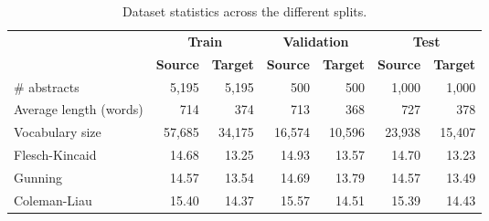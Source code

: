 \documentclass[letterpaper, table]{article} %
\begin{document}
\begin{table*}
\centering
\begin{tabular}{@{} l rr rr rr @{}}
\toprule
& \multicolumn{2}{c}{\bf Train} & \multicolumn{2}{c}{\bf Validation} & \multicolumn{2}{c}{\bf Test} \\
\cmidrule(lr){2-3}
\cmidrule(lr){4-5}
\cmidrule(lr){6-7}
\multicolumn{1}{c}{}                           & \textbf{Source}       & \textbf{Target}
& \textbf{Source}       & \textbf{Target}
& \textbf{Source}       & \textbf{Target}      \\
\midrule
\# abstracts                              & 5,195        & 5,195       & 500            & 500            & 1,000       & 1,000       \\
Average length (words)                      & 714          & 374         & 713            & 368            & 727         & 378         \\
Vocabulary size                                  & 57,685       & 34,175       & 16,574         & 10,596         & 23,938      & 15,407      \\ \midrule
Flesch-Kincaid & 14.68 & 13.25 & 14.93 & 13.57 & 14.70 & 13.23\\
Gunning & 14.57 & 13.54 & 14.69 & 13.79 & 14.57 & 13.49\\
Coleman-Liau & 15.40 & 14.37 & 15.57 & 14.51 & 15.39 & 14.43 \\
\bottomrule

\end{tabular}
\caption{Dataset statistics across the different splits.}
\label{data_description}

\end{table*}

\end{document}
